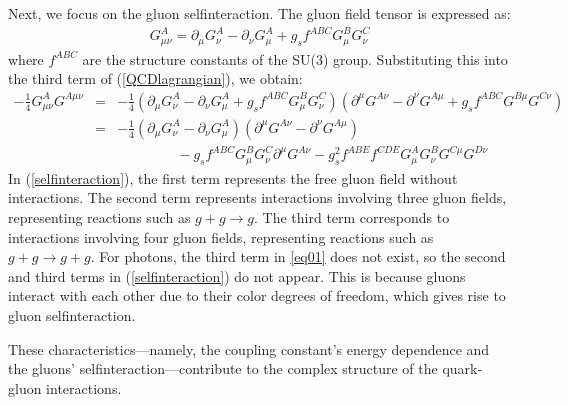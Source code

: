         Next, we focus on the gluon selfinteraction. The gluon field tensor is expressed as:
        \begin{eqnarray}
        \label{eq01}
            G^A_{\mu\nu} = \partial_\mu G^A_\nu - \partial_\nu G^A_\mu + g_s f^{ABC}G^B_\mu G^C_\nu
        \end{eqnarray}  
        where $f^{ABC}$ are the structure constants of the SU(3) group. Substituting this into the third term of (\ref{QCDlagrangian}), we obtain:  
        \begin{eqnarray}
            \nonumber
            -\frac{1}{4}G^A_{\mu\nu} G^{A\mu\nu} &=& -\frac{1}{4}(\partial_\mu G^A_\nu - \partial_\nu G^A_\mu + g_s f^{ABC} G^B_\mu G^C_\nu)(\partial^\mu G^{A\nu} - \partial^{\nu} G^{A\mu} + g_s f^{ABC} G^{B\mu} G^{C\nu})\\ 
            \nonumber
            &=& -\frac{1}{4}(\partial_\mu G^A_\nu - \partial_\nu G^A_\mu)(\partial^\mu G^{A\nu} - \partial^{\nu} G^{A\mu}) \\
            \label{selfinteraction}
            && \qquad\qquad\ - g_s f^{ABC}G^B_\mu G^C_\nu \partial^\mu G^{A\nu} - g_s^2 f^{ABE}f^{CDE}G^A_\mu G^B_\nu G^{C\mu}G^{D\nu}
        \end{eqnarray}  
        In (\ref{selfinteraction}), the first term represents the free gluon field without interactions. The second term represents interactions involving three gluon fields, representing reactions such as $g+g \rightarrow g$. The third term corresponds to interactions involving four gluon fields, representing reactions such as $g+g \rightarrow g+g$. For photons, the third term in \eqref{eq01} does not exist, so the second and third terms in (\ref{selfinteraction}) do not appear. This is because gluons interact with each other due to their color degrees of freedom, which gives rise to gluon selfinteraction.

        These characteristics—namely, the coupling constant's energy dependence and the gluons' selfinteraction—contribute to the complex structure of the quark-gluon interactions.
